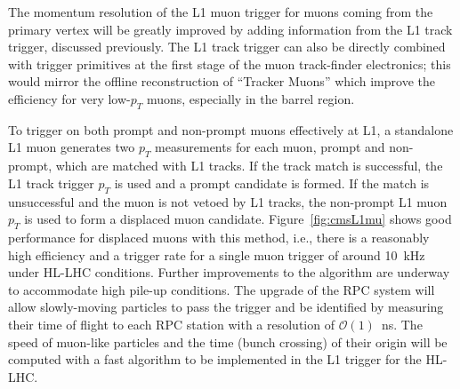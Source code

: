 The momentum resolution of the L1 muon trigger for muons coming from the primary vertex will be greatly improved by adding information from the L1 track trigger, discussed previously. The L1 track trigger can also be directly combined with trigger primitives at the first stage of the muon track-finder electronics; this would mirror the offline reconstruction of ``Tracker Muons'' which improve the efficiency for very low-$p_T$ muons, especially in the barrel region.

To trigger on both prompt and non-prompt muons effectively at L1, a standalone L1 muon generates two $p_T$ measurements for each muon, prompt and non-prompt, which are matched with L1 tracks. If the track match is successful, the L1 track trigger $p_T$ is used and a prompt candidate is formed. If the match is unsuccessful and the muon is not vetoed by L1 tracks, the non-prompt L1 muon $p_T$ is used to form a displaced muon candidate. Figure~\ref{fig:cmsL1mu} shows good performance for displaced muons with this method, i.e., there is a reasonably high efficiency and a trigger rate for a single muon trigger of around 10~kHz under HL-LHC conditions. Further improvements to the algorithm are underway to accommodate high pile-up conditions. The upgrade of the RPC system will allow slowly-moving particles to pass the trigger and be identified by measuring their time of flight to each RPC station with a resolution of $\mathcal{O}(1)$~ns. The speed of muon-like particles and the time (bunch crossing) of their
origin will be computed with a fast algorithm to be implemented in the L1 trigger for the HL-LHC.

